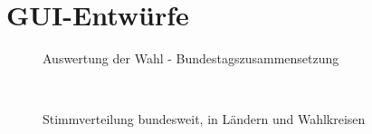 \documentclass[11pt,a4paper]{scrartcl}
\begin{document}
\newpage
\section{GUI-Entwürfe}
\begin{figure}[h!]
    \begin{center}
    \end{center}
    \caption{Auswertung der Wahl - Bundestagszusammensetzung}
    \label{fig:gui-auswertung}
\end{figure}
$ $\newline
\begin{figure}[h!]
    \begin{center}
    \end{center}
    \caption{Stimmverteilung bundesweit, in Ländern und Wahlkreisen}
    \label{fig:gui-stimmverteilung}
\end{figure}
\end{document}
